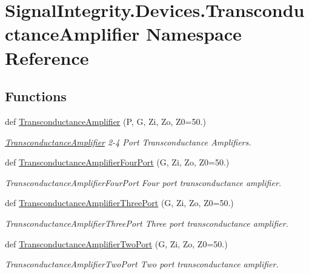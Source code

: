 \hypertarget{namespaceSignalIntegrity_1_1Devices_1_1TransconductanceAmplifier}{}\section{Signal\+Integrity.\+Devices.\+Transconductance\+Amplifier Namespace Reference}
\label{namespaceSignalIntegrity_1_1Devices_1_1TransconductanceAmplifier}
\subsection*{Functions}
\begin{DoxyCompactItemize}
\item 
def \hyperlink{namespaceSignalIntegrity_1_1Devices_1_1TransconductanceAmplifier_a4f22a921c3981307d49cc88fc2444380}{Transconductance\+Amplifier} (P, G, Zi, Zo, Z0=50.)
\begin{DoxyCompactList}\small\item\em \hyperlink{namespaceSignalIntegrity_1_1Devices_1_1TransconductanceAmplifier}{Transconductance\+Amplifier} 2-\/4 Port Transconductance Amplifiers. \end{DoxyCompactList}\item 
def \hyperlink{namespaceSignalIntegrity_1_1Devices_1_1TransconductanceAmplifier_af5d240920ffdded1e996e50a5895dbe8}{Transconductance\+Amplifier\+Four\+Port} (G, Zi, Zo, Z0=50.)
\begin{DoxyCompactList}\small\item\em Transconductance\+Amplifier\+Four\+Port Four port transconductance amplifier. \end{DoxyCompactList}\item 
def \hyperlink{namespaceSignalIntegrity_1_1Devices_1_1TransconductanceAmplifier_ab2b4cb827630c3e2e6cdfc2fdc2bcd81}{Transconductance\+Amplifier\+Three\+Port} (G, Zi, Zo, Z0=50.)
\begin{DoxyCompactList}\small\item\em Transconductance\+Amplifier\+Three\+Port Three port transconductance amplifier. \end{DoxyCompactList}\item 
def \hyperlink{namespaceSignalIntegrity_1_1Devices_1_1TransconductanceAmplifier_aa18ba8da4ca0d654240bc88a2df24e54}{Transconductance\+Amplifier\+Two\+Port} (G, Zi, Zo, Z0=50.)
\begin{DoxyCompactList}\small\item\em Transconductance\+Amplifier\+Two\+Port Two port transconductance amplifier. \end{DoxyCompactList}\end{DoxyCompactItemize}


